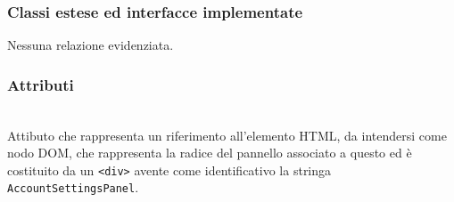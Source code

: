 \subsubsection*{Classi estese ed interfacce implementate}
Nessuna relazione evidenziata.

\subsubsection*{Attributi}
\begin{description}
\item{}\\
Attibuto che rappresenta un riferimento all'elemento HTML, da intendersi come nodo DOM, che rappresenta la radice del pannello associato a questo  ed è costituito da un \verb'<div>' avente come identificativo la stringa \verb'AccountSettingsPanel'.
\end{description}

